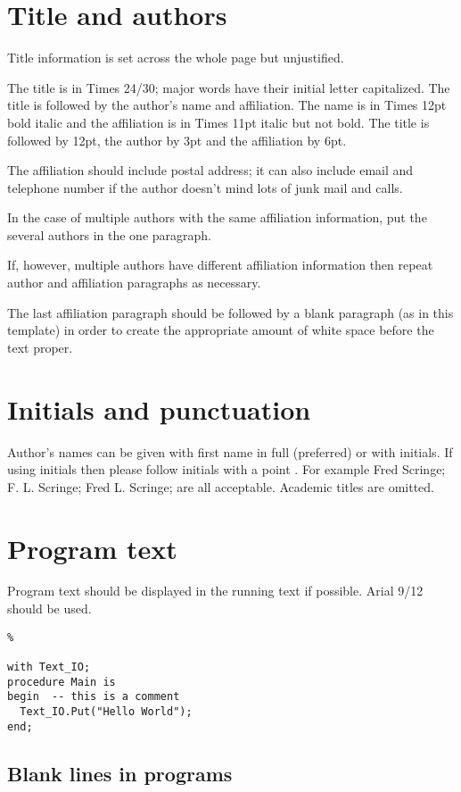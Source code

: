 \documentclass{AUJarticle}
\begin{document}
\section{Title and authors}

Title information is set across the whole page but unjustified. 

The title is in Times 24/30; major words have their initial letter capitalized. The title is
followed by the author's name and affiliation. The name is in Times 12pt bold italic and the
affiliation is in Times 11pt italic but not bold. The title is followed by 12pt, the author by
3pt and the affiliation by 6pt.

The affiliation should include postal address; it can also include email and telephone number if
the author doesn't mind lots of junk mail and calls.

In the case of multiple authors with the same affiliation information, put the several authors
in the one paragraph.

If, however, multiple authors have different affiliation information then repeat author and
affiliation paragraphs as necessary.

The last affiliation paragraph should be followed by a blank paragraph (as in this template) in
order to create the appropriate amount of white space before the text proper.

\section{Initials and punctuation}
Author's names can be given with first name in full (preferred) or with initials. If using
initials then please follow initials with a point . For example Fred Scringe; F. L. Scringe;
Fred L. Scringe; are all acceptable. Academic titles are omitted.

\section{Program text}
Program text should be displayed in the running text if possible. Arial 9/12 should be used.

\begin{lstlisting}%

with Text_IO;
procedure Main is
begin  -- this is a comment
  Text_IO.Put("Hello World");
end;

\end{lstlisting}

\subsection{Blank lines in programs}
\end{document}
